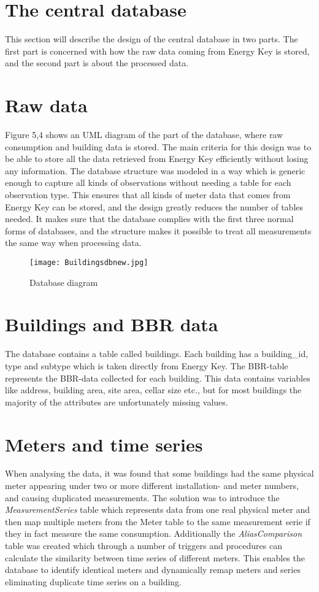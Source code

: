 \section{The central database}
This section will describe the design of the central database in two parts. The first part is concerned with how the raw data coming from Energy Key is stored, and the second part is about the processed data.
\section*{Raw data}
Figure 5,4 shows an UML diagram of the part of the database, where raw consumption and building data is stored. The main criteria for this design was to be able to store all the data retrieved from Energy Key efficiently without losing any information. The database structure was modeled in a way which is generic enough to capture all kinds of observations without needing a table for each observation type. This ensures that all kinds of meter data that comes from Energy Key can be stored, and the design greatly reduces the number of tables needed. It makes sure that the database complies with the first three normal forms of databases, and the structure makes it possible to treat all measurements the same way when processing data.
\begin{figure}
\texttt{[image: Buildingsdbnew.jpg]}
\caption{Database diagram}
\end{figure}
\section*{Buildings and BBR data}
The database contains a table called buildings. Each building has a building\_id, type and subtype which is taken directly from Energy Key. The BBR-table represents the BBR-data collected for each building. This data contains variables like address, building area, site area, cellar size etc., but for most buildings the majority of the attributes are unfortunately missing values.
\section*{Meters and time series}
When analysing the data, it was found that some buildings had the same physical meter appearing under two or more different installation- and meter numbers, and causing duplicated measurements. The solution was to introduce the \emph{MeasurementSeries} table which represents data from one real physical meter and then map multiple meters from the Meter table to the same measurement serie if they in fact measure the same consumption. Additionally the \emph{AliasComparison} table was created which through a number of triggers and procedures can calculate the similarity between time series of different meters. This enables the database to identify identical meters and dynamically remap meters and series eliminating duplicate time series on a building.
